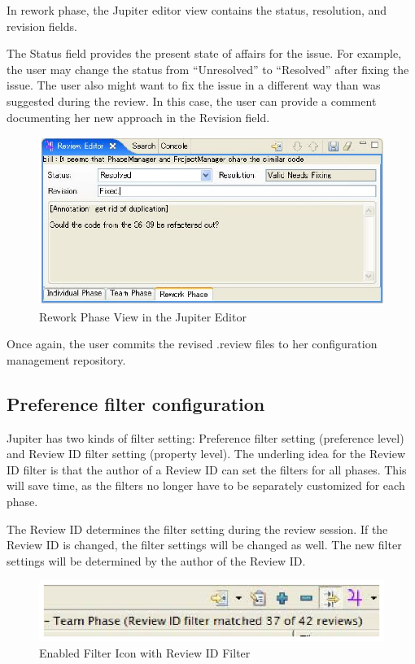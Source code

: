 In rework phase, the Jupiter editor view contains the status, resolution, and revision fields.

The Status field provides the present state of affairs for the issue. For example, the user may change the status from ``Unresolved'' to ``Resolved'' after fixing the issue. The user also might want to fix the issue in a different way than was suggested during the review. In this case, the user can provide a comment documenting her new approach in the Revision field. 

\begin{figure}[htbp]
  \centering
  \includegraphics{images/fig3-35.eps}
  \caption{Rework Phase View in the Jupiter Editor}
  \label{fig3-35}
\end{figure}

Once again, the user commits the revised .review files to her configuration management repository. 

\subsection{Preference filter configuration}
\label{subsec:preference-filter-configuration}

Jupiter has two kinds of filter setting: Preference filter setting (preference level) and Review ID filter setting (property level). The underling idea for the Review ID filter is that the author of a Review ID can set the filters for all phases. This will save time, as the filters no longer have to be separately customized for each phase.

The Review ID determines the filter setting during the review session. If the Review ID is changed, the filter settings will be changed as well. The new filter settings will be determined by the author of the Review ID.

\begin{figure}[htbp]
  \centering
  \includegraphics{images/fig3-36.eps}
  \caption{Enabled Filter Icon with Review ID Filter}
  \label{fig3-36}
\end{figure}

